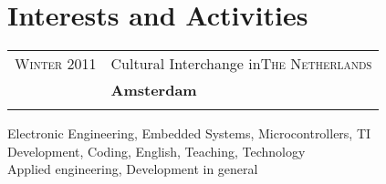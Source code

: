 \documentclass[a4paper,10pt]{article} %
\begin{document}

\section{Interests and Activities}
\begin{tabular}{rl}
\textsc{Winter} 2011 & Cultural Interchange in\textsc{The Netherlands}\textsc{}\\
& \small\emph{}\normalsize\textbf{Amsterdam}\\
&\\
\end{tabular}

Electronic Engineering, Embedded Systems, Microcontrollers, TI\\
Development, Coding, English, Teaching, Technology \\
Applied engineering, Development in general



\end{document}
